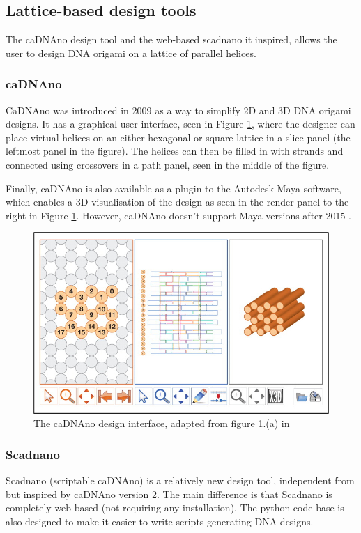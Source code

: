 \subsection{Lattice-based design tools}
The caDNAno design tool \cite{cadnano} and the web-based scadnano\cite{scadnano} it inspired, allows the user to design DNA origami on a lattice of parallel helices.
\subsubsection{caDNAno}
CaDNAno \cite{cadnano} was introduced in 2009 as a way to simplify 2D and 3D DNA origami designs. It has a graphical user interface, seen in Figure \ref{fig:cadnano}, where the designer can place virtual helices on an either hexagonal or square lattice in a slice panel (the leftmost panel in the figure). The helices can then be filled in with strands and connected using crossovers in a path panel, seen in the middle of the figure.

Finally, caDNAno is also available as a plugin to the Autodesk Maya software, which enables a 3D visualisation of the design as seen in the render panel to the right in Figure \ref{fig:cadnano}. However, caDNAno doesn't support Maya versions after 2015 \cite{cadnanoInstall}.

\begin{figure}[h]
  \begin{center}
    \includegraphics[width=\textwidth]{figures/cadnano.jpeg}
    \caption{The caDNAno design interface, adapted from figure 1.(a) in \cite{cadnano}}
    \label{fig:cadnano}
  \end{center}
\end{figure}

\subsubsection{Scadnano}
Scadnano \cite{scadnano} (scriptable caDNAno) is a relatively new design tool, independent from but inspired by caDNAno version 2. The main difference is that Scadnano is completely web-based (not requiring any installation). The python code base is also designed to make it easier to write scripts generating DNA designs.

